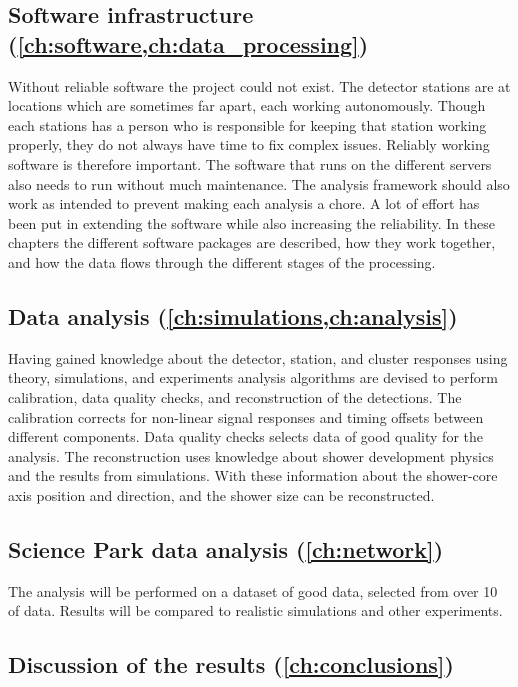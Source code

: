 \subsection{Software infrastructure
            (\cref{ch:software,ch:data_processing})}

Without reliable software the \hisparc project could not exist. The detector stations are at locations which are sometimes far apart, each working autonomously. Though each stations has a person who is responsible for keeping that station working properly, they do not always have time to fix complex issues. Reliably working software is therefore important. The software that runs on the different \hisparc servers also needs to run without much maintenance. The analysis framework should also work as intended to prevent making each analysis a chore. A lot of effort has been put in extending the software while also increasing the reliability. In these chapters the different software packages are described, how they work together, and how the data flows through the different stages of the processing.


\subsection{Data analysis
            (\cref{ch:simulations,ch:analysis})}

Having gained knowledge about the detector, station, and cluster responses using theory, simulations, and experiments analysis algorithms are devised to perform calibration, data quality checks, and reconstruction of the detections. The calibration corrects for non-linear signal responses and timing offsets between different components. Data quality checks selects data of good quality for the analysis. The reconstruction uses knowledge about shower development physics and the results from simulations. With these information about the shower-core axis position and direction, and the shower size can be reconstructed.


\subsection{Science Park data analysis
            (\cref{ch:network})}

The analysis will be performed on a dataset of good data, selected from over \SI{10}{\year} of \hisparc data. Results will be compared to realistic simulations and other experiments.


\subsection{Discussion of the results
            (\cref{ch:conclusions})}

